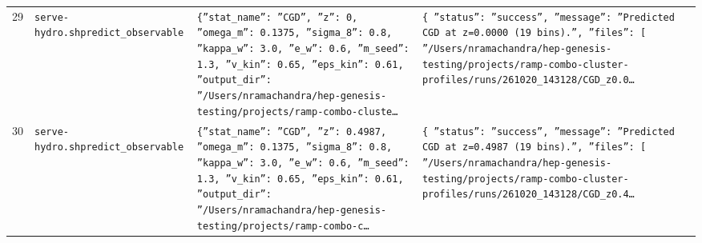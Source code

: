 \documentclass[11pt,a4paper]{article}
\begin{document}
\begin{longtable}{@{}p{}p{}p{}p{}@{}}
29 & \texttt{serve-hydro.sh}\newline\texttt{predict\_\allowbreak{}observable} & \texttt{\{''stat\_\allowbreak{}name'':\allowbreak{} ''CGD'',\allowbreak{} ''z'':\allowbreak{} 0,\allowbreak{} ''omega\_\allowbreak{}m'':\allowbreak{} 0.1375,\allowbreak{} ''sigma\_\allowbreak{}8'':\allowbreak{} 0.8,\allowbreak{} ''kappa\_\allowbreak{}w'':\allowbreak{} 3.0,\allowbreak{} ''e\_\allowbreak{}w'':\allowbreak{} 0.6,\allowbreak{} ''m\_\allowbreak{}seed'':\allowbreak{} 1.3,\allowbreak{} ''v\_\allowbreak{}kin'':\allowbreak{} 0.65,\allowbreak{} ''eps\_\allowbreak{}kin'':\allowbreak{} 0.61,\allowbreak{} ''output\_\allowbreak{}dir'':\allowbreak{} ''/\allowbreak{}Users/\allowbreak{}nramachandra/\allowbreak{}hep-genesis-testing/\allowbreak{}projects/\allowbreak{}ramp-combo-cluste\ldots{}\allowbreak{}} & \texttt{\{   ''status'':\allowbreak{} ''success'',\allowbreak{}   ''message'':\allowbreak{} ''Predicted CGD at z=\allowbreak{}0.0000 (19 bins)\allowbreak{}.'',\allowbreak{}   ''files'':\allowbreak{} [     ''/\allowbreak{}Users/\allowbreak{}nramachandra/\allowbreak{}hep-genesis-testing/\allowbreak{}projects/\allowbreak{}ramp-combo-cluster-profiles/\allowbreak{}runs/\allowbreak{}261020\_\allowbreak{}143128/\allowbreak{}CGD\_\allowbreak{}z0.0\ldots{}\allowbreak{}} \\
30 & \texttt{serve-hydro.sh}\newline\texttt{predict\_\allowbreak{}observable} & \texttt{\{''stat\_\allowbreak{}name'':\allowbreak{} ''CGD'',\allowbreak{} ''z'':\allowbreak{} 0.4987,\allowbreak{} ''omega\_\allowbreak{}m'':\allowbreak{} 0.1375,\allowbreak{} ''sigma\_\allowbreak{}8'':\allowbreak{} 0.8,\allowbreak{} ''kappa\_\allowbreak{}w'':\allowbreak{} 3.0,\allowbreak{} ''e\_\allowbreak{}w'':\allowbreak{} 0.6,\allowbreak{} ''m\_\allowbreak{}seed'':\allowbreak{} 1.3,\allowbreak{} ''v\_\allowbreak{}kin'':\allowbreak{} 0.65,\allowbreak{} ''eps\_\allowbreak{}kin'':\allowbreak{} 0.61,\allowbreak{} ''output\_\allowbreak{}dir'':\allowbreak{} ''/\allowbreak{}Users/\allowbreak{}nramachandra/\allowbreak{}hep-genesis-testing/\allowbreak{}projects/\allowbreak{}ramp-combo-c\ldots{}\allowbreak{}} & \texttt{\{   ''status'':\allowbreak{} ''success'',\allowbreak{}   ''message'':\allowbreak{} ''Predicted CGD at z=\allowbreak{}0.4987 (19 bins)\allowbreak{}.'',\allowbreak{}   ''files'':\allowbreak{} [     ''/\allowbreak{}Users/\allowbreak{}nramachandra/\allowbreak{}hep-genesis-testing/\allowbreak{}projects/\allowbreak{}ramp-combo-cluster-profiles/\allowbreak{}runs/\allowbreak{}261020\_\allowbreak{}143128/\allowbreak{}CGD\_\allowbreak{}z0.4\ldots{}\allowbreak{}} \\

\end{longtable}
\end{document}

